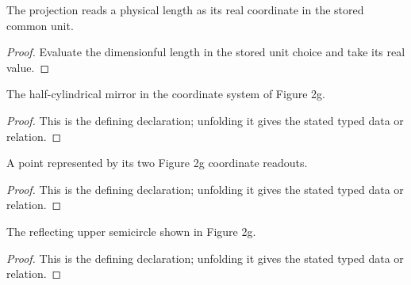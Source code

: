 \begin{definition}
  \label{decl:physics:IPhO_2026_2_C_3:Figure2gLengthProjection:readout}
  The projection reads a physical length as its real coordinate in the stored
  common unit.
\end{definition}
\begin{proof}
  Evaluate the dimensionful length in the stored unit choice and take its real
  value.
\end{proof}

\begin{definition}
  \label{decl:physics:IPhO_2026_2_C_3:Figure2gMirror}
  The half-cylindrical mirror in the coordinate system of Figure 2g.
\end{definition}
\begin{proof}
  This is the defining declaration; unfolding it gives the stated typed data or relation.
\end{proof}

\begin{definition}
  \label{decl:physics:IPhO_2026_2_C_3:Figure2gPoint}
  A point represented by its two Figure 2g coordinate readouts.
\end{definition}
\begin{proof}
  This is the defining declaration; unfolding it gives the stated typed data or relation.
\end{proof}

\begin{definition}
  \label{decl:physics:IPhO_2026_2_C_3:Figure2gMirror:OnReflectingSurface}
  The reflecting upper semicircle shown in Figure 2g.
\end{definition}
\begin{proof}
  This is the defining declaration; unfolding it gives the stated typed data or relation.
\end{proof}

